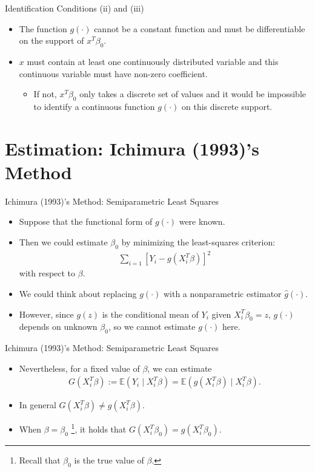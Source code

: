 \documentclass[xcolor=svgnames,dvipdfmx,cjk]{beamer}
\theoremstyle{example}
\begin{document}
\begin{frame}{Identification Conditions (ii) and (iii)}
\begin{itemize}
  \item The function $g(\cdot)$ cannot be a constant function and must be differentiable on the support of $x^{T}\beta_0$.
  \item $x$ must contain at least one continuously distributed variable
        and this continuous variable must have non-zero coefficient.
        \begin{itemize}
          \item  If not, $x^{T} \beta_0$ only takes a discrete set of values and it would be impossible to identify a continuous function $g(\cdot)$ on this discrete support.
        \end{itemize}
\end{itemize}
\end{frame}


\section{Estimation: Ichimura (1993)'s Method}


\begin{frame}{Ichimura (1993)'s Method: Semiparametric Least Squares}
\begin{itemize}
  \item Suppose that the functional form of $g(\cdot)$ were known.
  \item Then we could estimate $\beta_0$ by minimizing the least-squares criterion:
        \begin{align*}
        \sum_{i=1} \left[ Y_i - g(X_i^{T}\beta) \right]^2
        \end{align*}
        with respect to $\beta$.
  \item We could think about replacing $g(\cdot)$ with a nonparametric estimator $\hat{g}(\cdot)$.
  \item However, since $g(z)$ is the conditional mean of $Y_i$ given $X_i^{T} \beta_0 = z$,
        $g(\cdot)$ depends on unknown $\beta_0$, so we cannot estimate $g(\cdot)$ here.
\end{itemize}
\end{frame}

\begin{frame}{Ichimura (1993)'s Method: Semiparametric Least Squares}
\begin{itemize}
  \item Nevertheless, for a fixed value of $\beta$, we can estimate
        \begin{align*}
        G(X_i^{T} \beta) 
          := \mathbb{E} (Y_i \mid X_i^{T}\beta) 
           = \mathbb{E} (g(X_i^{T}\beta) \mid X_i^{T}\beta).
        \end{align*}
  \item In general $G(X_i^{T}\beta) \neq g(X_i^{T} \beta)$.
  \item When $\beta = \beta_0$ \footnote{Recall that $\beta_0$ is the true value of $\beta$.},
        it holds that $G(X_i^{T}\beta_0) = g(X_i^{T} \beta_0)$. 
\end{itemize}  
\end{frame}
\end{document}
